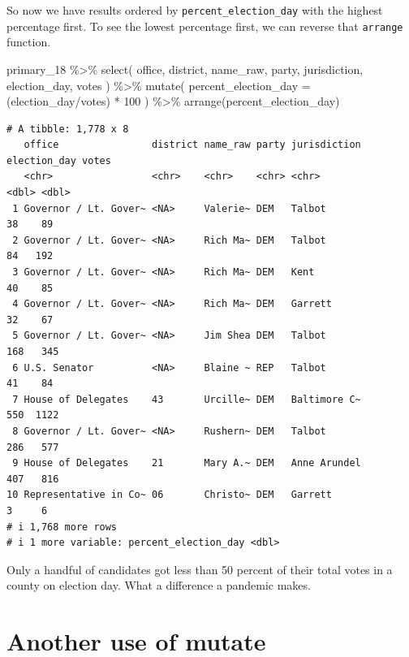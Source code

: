 \documentclass[
  letterpaper,
  DIV=11,
  numbers=noendperiod]{scrreprt}
\newenvironment{Shaded}{\begin{snugshade}}{\end{snugshade}}
\newcommand{\AttributeTok}[1]{\textcolor[rgb]{0.40,0.45,0.13}{#1}}
\newcommand{\DecValTok}[1]{\textcolor[rgb]{0.68,0.00,0.00}{#1}}
\newcommand{\FunctionTok}[1]{\textcolor[rgb]{0.28,0.35,0.67}{#1}}
\newcommand{\NormalTok}[1]{\textcolor[rgb]{0.00,0.23,0.31}{#1}}
\newcommand{\SpecialCharTok}[1]{\textcolor[rgb]{0.37,0.37,0.37}{#1}}
\begin{document}
So now we have results ordered by \texttt{percent\_election\_day} with
the highest percentage first. To see the lowest percentage first, we can
reverse that \texttt{arrange} function.

\begin{Shaded}
\begin{Highlighting}[]
\NormalTok{primary\_18 }\SpecialCharTok{\%\textgreater{}\%}
  \FunctionTok{select}\NormalTok{(}
\NormalTok{    office, district, name\_raw, party, jurisdiction, election\_day, votes}
\NormalTok{    ) }\SpecialCharTok{\%\textgreater{}\%}
  \FunctionTok{mutate}\NormalTok{(}
    \AttributeTok{percent\_election\_day =}\NormalTok{ (election\_day}\SpecialCharTok{/}\NormalTok{votes) }\SpecialCharTok{*} \DecValTok{100}
\NormalTok{    ) }\SpecialCharTok{\%\textgreater{}\%}
  \FunctionTok{arrange}\NormalTok{(percent\_election\_day)}
\end{Highlighting}
\end{Shaded}

\begin{verbatim}
# A tibble: 1,778 x 8
   office                district name_raw party jurisdiction election_day votes
   <chr>                 <chr>    <chr>    <chr> <chr>               <dbl> <dbl>
 1 Governor / Lt. Gover~ <NA>     Valerie~ DEM   Talbot                 38    89
 2 Governor / Lt. Gover~ <NA>     Rich Ma~ DEM   Talbot                 84   192
 3 Governor / Lt. Gover~ <NA>     Rich Ma~ DEM   Kent                   40    85
 4 Governor / Lt. Gover~ <NA>     Rich Ma~ DEM   Garrett                32    67
 5 Governor / Lt. Gover~ <NA>     Jim Shea DEM   Talbot                168   345
 6 U.S. Senator          <NA>     Blaine ~ REP   Talbot                 41    84
 7 House of Delegates    43       Urcille~ DEM   Baltimore C~          550  1122
 8 Governor / Lt. Gover~ <NA>     Rushern~ DEM   Talbot                286   577
 9 House of Delegates    21       Mary A.~ DEM   Anne Arundel          407   816
10 Representative in Co~ 06       Christo~ DEM   Garrett                 3     6
# i 1,768 more rows
# i 1 more variable: percent_election_day <dbl>
\end{verbatim}

Only a handful of candidates got less than 50 percent of their total
votes in a county on election day. What a difference a pandemic makes.

\hypertarget{another-use-of-mutate}{%
\section{Another use of mutate}\label{another-use-of-mutate}}
\end{document}
